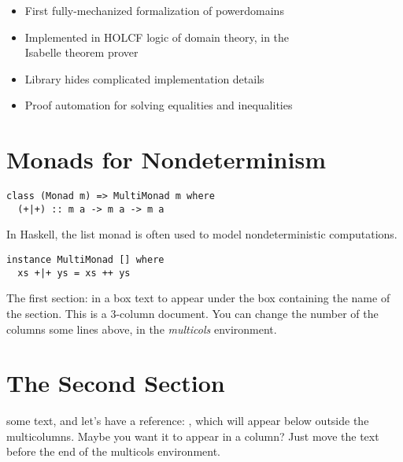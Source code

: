 \documentclass[portrait]{sciposter}
\begin{document}
\begin{multicols}{3}

\begin{sectionbox}{}
\begin{itemize}
\item First fully-mechanized formalization of powerdomains
\item Implemented in HOLCF logic of domain theory, in the\\ Isabelle theorem prover
\item Library hides complicated implementation details
\item Proof automation for solving equalities and inequalities
\end{itemize}
\end{sectionbox}

\section{Monads for Nondeterminism}

\begin{verbatim}
class (Monad m) => MultiMonad m where
  (+|+) :: m a -> m a -> m a
\end{verbatim}

In Haskell, the list monad is often used to model nondeterministic computations.

\begin{verbatim}
instance MultiMonad [] where
  xs +|+ ys = xs ++ ys
\end{verbatim}

\begin{sectionbox}{The first section: in a box}
 text to appear under the box containing the name of the section. This is a 3-column document. You can change the number of the columns some lines above, in the {\it multicols} environment. 
\end{sectionbox}

\section{The Second Section}

 some text, and let's have a reference: \cite{areference}, which will appear below outside the multicolumns. Maybe you want it to appear in a column? Just move the text before the end of the multicols environment.


\end{multicols}
\end{document}
